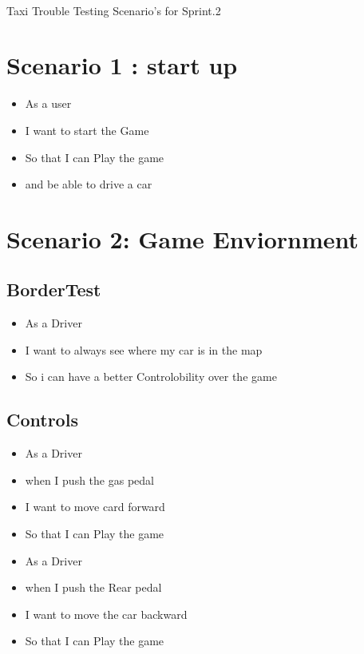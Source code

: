 \documentclass{article}
\begin{document}

		\begin{center}
			\\
				\Huge{Taxi Trouble Testing Scenario's for Sprint.2}
		\end{center}
		
		
\section*{Scenario 1 : start up}
\begin{itemize}
	\item As a user
	\item I want to start the Game 
	\item So that I can Play the game
	\item and be able to drive a car
\end{itemize}

\section*{Scenario 2: Game Enviornment}
\subsection*{BorderTest} %
\begin{itemize}
	\item As a Driver
	\item I want to always see where my car is in the map
	\item So i can have a better Controlobility over the game
\end{itemize}

\subsection{Controls} %

\begin{itemize}
	\item As a Driver
	\item when I push the gas pedal 
	\item I want to move card forward
	\item So that I can Play the game
\end{itemize}

\begin{itemize}
	\item As a Driver
	\item when I push the Rear pedal 
	\item I want to move the car backward
	\item So that I can Play the game
\end{itemize}


 
\end{document}
